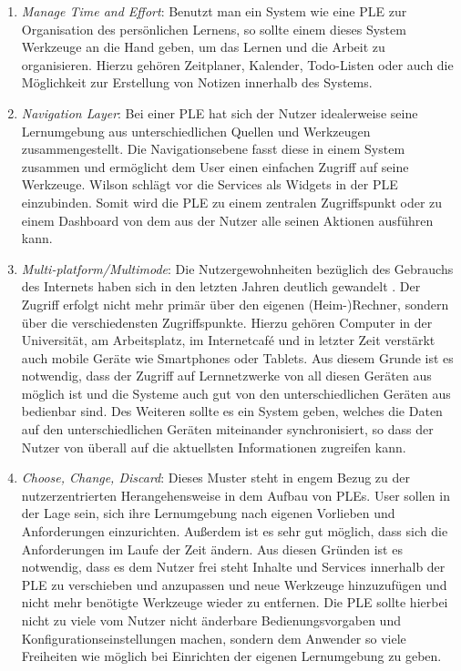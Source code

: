 \begin{enumerate}
 \item \emph{Manage Time and Effort}\label{wilson_patterns:manage_time_effort}: Benutzt man ein System wie eine PLE zur Organisation des persönlichen Lernens, so sollte einem dieses System Werkzeuge an die Hand geben, um das Lernen und die Arbeit zu organisieren. Hierzu gehören Zeitplaner, Kalender, Todo-Listen oder auch die Möglichkeit zur Erstellung von Notizen innerhalb des Systems.
 \item \emph{Navigation Layer}\label{wilson_patterns:navigation_layer}: Bei einer PLE hat sich der Nutzer idealerweise seine Lernumgebung aus unterschiedlichen Quellen und Werkzeugen zusammengestellt. Die Navigationsebene fasst diese in einem System zusammen und ermöglicht dem User einen einfachen Zugriff auf seine Werkzeuge. Wilson schlägt vor die Services als Widgets in der PLE einzubinden. Somit wird die PLE zu einem zentralen Zugriffspunkt oder zu einem Dashboard von dem aus der Nutzer alle seinen Aktionen ausführen kann. 
 \item \emph{Multi-platform/Multimode}\label{wilson_patterns:multimode}: Die Nutzergewohnheiten bezüglich des Gebrauchs des Internets haben sich in den letzten Jahren deutlich gewandelt \cite{VanHarmelen}. Der Zugriff erfolgt nicht mehr primär über den eigenen (Heim-)Rechner, sondern über die verschiedensten Zugriffspunkte. Hierzu gehören Computer in der Universität, am Arbeitsplatz, im Internetcafé und in letzter Zeit verstärkt auch mobile Geräte wie Smartphones oder Tablets. Aus diesem Grunde ist es notwendig, dass der Zugriff auf Lernnetzwerke von all diesen Geräten aus möglich ist und die Systeme auch gut von den unterschiedlichen Geräten aus bedienbar sind. Des Weiteren sollte es ein System geben, welches die Daten auf den unterschiedlichen Geräten miteinander synchronisiert, so dass der Nutzer von überall auf die aktuellsten Informationen zugreifen kann.
 \item \emph{Choose, Change, Discard}\label{wilson_patterns:choose_change_discard}: Dieses Muster steht in engem Bezug zu der nutzerzentrierten Herangehensweise in dem Aufbau von PLEs. User sollen in der Lage sein, sich ihre Lernumgebung nach eigenen Vorlieben und Anforderungen einzurichten. Außerdem ist es sehr gut möglich, dass sich die Anforderungen im Laufe der Zeit ändern. Aus diesen Gründen ist es notwendig, dass es dem Nutzer frei steht Inhalte und Services innerhalb der PLE zu verschieben und anzupassen und neue Werkzeuge hinzuzufügen und nicht mehr benötigte Werkzeuge wieder zu entfernen. Die PLE sollte hierbei nicht zu viele vom Nutzer nicht änderbare Bedienungsvorgaben und Konfigurationseinstellungen machen, sondern dem Anwender so viele Freiheiten wie möglich bei Einrichten der eigenen Lernumgebung zu geben.
\end{enumerate}

